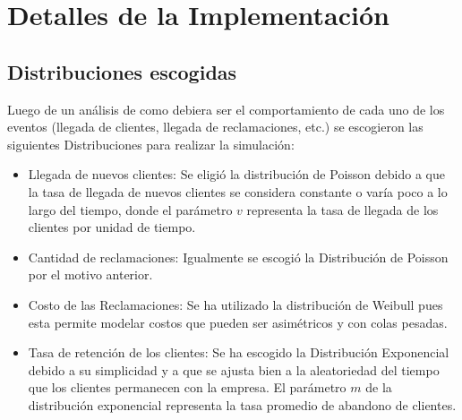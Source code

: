 \documentclass{article}
\begin{document}
\section{Detalles de la Implementación}

\subsection{Distribuciones escogidas}
Luego de un análisis de como debiera ser el comportamiento de cada uno de los eventos (llegada de clientes, llegada de reclamaciones, etc.) se escogieron las siguientes Distribuciones para realizar la simulación:
\begin{itemize}
    \item Llegada de nuevos clientes: Se eligió la distribución de Poisson debido a que la tasa de llegada de nuevos clientes se considera constante o varía poco a lo largo del tiempo, donde el parámetro $v$ representa la tasa de llegada de los clientes por unidad de tiempo.
    \item Cantidad de reclamaciones: Igualmente se escogió la Distribución de Poisson por el motivo anterior.
    \item Costo de las Reclamaciones: Se ha utilizado la distribución de Weibull pues esta permite modelar costos que pueden ser asimétricos y con colas pesadas.
    \item Tasa de retención de los clientes: Se ha escogido la Distribución Exponencial debido a su simplicidad y a que se ajusta bien a la aleatoriedad del tiempo que los clientes permanecen con la empresa.
    El parámetro $m$ de la distribución exponencial representa la tasa promedio de abandono de clientes.

\end{itemize}
\end{document}
